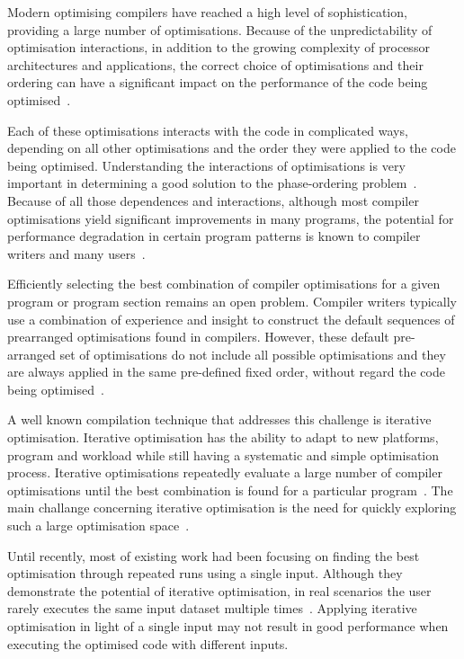\documentclass[sigplan,9pt]{acmart}
\begin{document}
Modern optimising compilers
have reached a high level of sophistication,
providing a large number of optimisations.
Because of the unpredictability of optimisation
interactions, in addition to the growing complexity
of processor architectures and applications,
the correct choice of optimisations and their ordering
can have a significant impact on the performance of the
code being optimised~\cite{pan06,fursin07,kulkarni12}.

Each of these optimisations interacts with the code in complicated ways,
depending on all other optimisations and the order they were applied to
the code being optimised.
Understanding the interactions of optimisations is very important
in determining a good solution to the phase-ordering problem~\cite{touati06,kulkarni12}.
Because of all those dependences and interactions, although
most compiler optimisations yield significant improvements
in many programs, the potential for performance degradation in
certain program patterns is known to compiler writers and many users~\cite{pan06,zhou12,kulkarni12}.

Efficiently selecting the best combination of compiler optimisations
for a given program or program section remains an open problem.
Compiler writers typically use a combination of experience and insight to construct
the default sequences of prearranged optimisations found in compilers.
However, these default pre-arranged set of optimisations do not include all possible optimisations
and they are always applied in the same pre-defined fixed order, without regard the code being optimised~\cite{pan06,cavazos07,zhou12,kulkarni12}.

A well known compilation technique that addresses this challenge is iterative
optimisation.
Iterative optimisation has the ability to adapt to new
platforms, program and workload while still
having a systematic and simple optimisation process.
Iterative optimisations repeatedly evaluate a large number
of compiler optimisations until the best combination is
found for a particular program~\cite{fursin07,chen10}.
The main challange concerning iterative optimisation is the need for quickly
exploring such a large optimisation space~\cite{fursin07,cavazos07,zhou12}.

Until recently, most of existing work  had been focusing
on finding the best optimisation through repeated runs using a single input.
Although they demonstrate the potential of iterative optimisation,
in real scenarios the user rarely executes the same input dataset multiple times~\cite{bodin98,kisuki99,stephenson03,kulkarni04,agakov06}.
Applying iterative optimisation in light of a single input may not result in good performance when executing the optimised code with different inputs.
\end{document}
